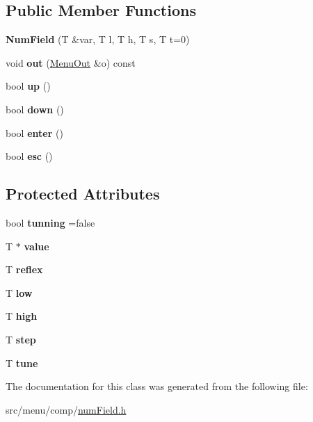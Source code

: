 \subsection*{Public Member Functions}
\begin{DoxyCompactItemize}
\item 
\mbox{\label{classNumField_ac31c0e5c4a8dfc82780e643140c608f8}} 
{\bfseries Num\+Field} (T \&var, T l, T h, T s, T t=0)
\item 
\mbox{\label{classNumField_a0f94b131552e24e24516ed07c3345564}} 
void {\bfseries out} (\hyperlink{structMenuOut}{Menu\+Out} \&o) const
\item 
\mbox{\label{classNumField_a1fc5409fdd22fbca9ffcfdbe90cf9929}} 
bool {\bfseries up} ()
\item 
\mbox{\label{classNumField_ae0bd47d4969d695fa7cff81e44d4dff9}} 
bool {\bfseries down} ()
\item 
\mbox{\label{classNumField_abe795198b4e2b95502933164d3cd64ec}} 
bool {\bfseries enter} ()
\item 
\mbox{\label{classNumField_ae7697ba53072d3eacf0a041c93140f4e}} 
bool {\bfseries esc} ()
\end{DoxyCompactItemize}
\subsection*{Protected Attributes}
\begin{DoxyCompactItemize}
\item 
\mbox{\label{classNumField_a1c72fd5bc1775e6cfaed2b4594ac0700}} 
bool {\bfseries tunning} =false
\item 
\mbox{\label{classNumField_a548ac7ac150b3b12811bfef53d9636a5}} 
T $\ast$ {\bfseries value}
\item 
\mbox{\label{classNumField_ad17a73e2250ebbd5dda7ee3a79dfb522}} 
T {\bfseries reflex}
\item 
\mbox{\label{classNumField_a9e04257f27cf53402e8d787b6a1d561e}} 
T {\bfseries low}
\item 
\mbox{\label{classNumField_ab40ba1ee654bc48e827b78297b384714}} 
T {\bfseries high}
\item 
\mbox{\label{classNumField_acd99c4f2a3c0b3477535399485782827}} 
T {\bfseries step}
\item 
\mbox{\label{classNumField_af28a046a1c71b17e8ac7ed17abba03ff}} 
T {\bfseries tune}
\end{DoxyCompactItemize}


The documentation for this class was generated from the following file\+:\begin{DoxyCompactItemize}
\item 
src/menu/comp/\hyperlink{numField_8h}{num\+Field.\+h}\end{DoxyCompactItemize}
